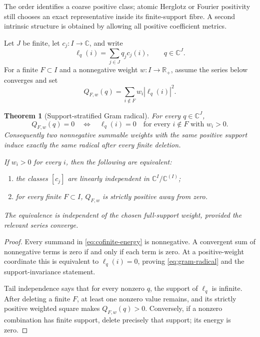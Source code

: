 \documentclass[11pt]{article}
\newtheorem{theorem}{Theorem}[section]
\theoremstyle{definition}
\theoremstyle{remark}
\newcommand{\C}{\mathbb C}
\newcommand{\R}{\mathbb R}
\begin{document}
The order identifies a coarse positive class; atomic Herglotz or Fourier positivity still
chooses an exact representative inside its finite-support fibre.  A second intrinsic structure
is obtained by allowing all positive coefficient metrics.

Let \(J\) be finite, let \(c_j:I\to\C\), and write
\[
  \ell_q(i)=\sum_{j\in J}q_jc_j(i),
  \qquad q\in\C^J.
\]
For a finite \(F\subset I\) and a nonnegative weight \(w:I\to\R_+\), assume the series below
converges and set
\begin{equation}\label{eq:cofinite-energy}
  Q_{F,w}(q)=\sum_{i\notin F}w_i|\ell_q(i)|^2.
\end{equation}

\begin{theorem}[Support-stratified Gram radical]
\label{thm:gram-radical}
For every \(q\in\C^J\),
\begin{equation}\label{eq:gram-radical}
  Q_{F,w}(q)=0
  \quad\Longleftrightarrow\quad
  \ell_q(i)=0
  \quad\text{for every }i\notin F\text{ with }w_i>0.
\end{equation}
Consequently two nonnegative summable weights with the same positive support induce exactly the
same radical after every finite deletion.

If \(w_i>0\) for every \(i\), then the following are equivalent:
\begin{enumerate}[label=(\roman*),leftmargin=2.2em]
  \item the classes \([c_j]\) are linearly independent in
  \(\C^I/\C^{(I)}\);
  \item for every finite \(F\subset I\), \(Q_{F,w}\) is strictly positive away from zero.
\end{enumerate}
The equivalence is independent of the chosen full-support weight, provided the relevant series
converge.
\end{theorem}

\begin{proof}
Every summand in \eqref{eq:cofinite-energy} is nonnegative.  A convergent sum of nonnegative
terms is zero if and only if each term is zero.  At a positive-weight coordinate this is
equivalent to \(\ell_q(i)=0\), proving \eqref{eq:gram-radical} and the support-invariance
statement.

Tail independence says that for every nonzero \(q\), the support of \(\ell_q\) is infinite.
After deleting a finite \(F\), at least one nonzero value remains, and its strictly positive
weighted square makes \(Q_{F,w}(q)>0\).  Conversely, if a nonzero combination has finite support,
delete precisely that support; its energy is zero.
\end{proof}
\end{document}
